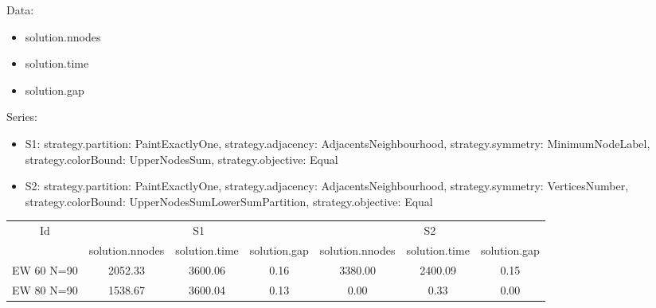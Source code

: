 \documentclass[landscape, 12pt]{report}
\begin{document}
Data:
\begin{itemize}
\item solution.nnodes
\item solution.time
\item solution.gap
\end{itemize}
Series:
\begin{itemize}
\item S1: strategy.partition: PaintExactlyOne, strategy.adjacency: AdjacentsNeighbourhood, strategy.symmetry: MinimumNodeLabel, strategy.colorBound: UpperNodesSum, strategy.objective: Equal
\item S2: strategy.partition: PaintExactlyOne, strategy.adjacency: AdjacentsNeighbourhood, strategy.symmetry: VerticesNumber, strategy.colorBound: UpperNodesSumLowerSumPartition, strategy.objective: Equal
\end{itemize}
\begin{tabular}{|c|ccc|ccc|}
\hline
\multicolumn{1}{|c|}{Id} & \multicolumn{3}{|c|}{S1} & \multicolumn{3}{|c|}{S2}
\\
 & solution.nnodes & solution.time & solution.gap & solution.nnodes & solution.time & solution.gap
\\
\hline
EW 60 N=90 & 2052.33 & 3600.06 & 0.16 & 3380.00 & 2400.09 & 0.15
\\
EW 80 N=90 & 1538.67 & 3600.04 & 0.13 & 0.00 & 0.33 & 0.00
\\
\hline 
 \end{tabular}
\end{document}
